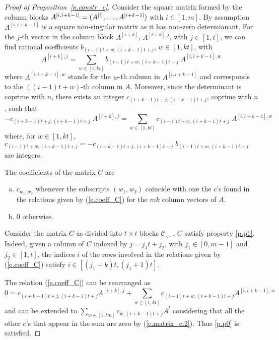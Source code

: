 \documentclass[10pt]{article}
\begin{document}
\begin{proof}[Proof of Proposition~\ref{p.constr_c}]
	Consider the square matrix formed by the column blocks $A^{[i,i+k-1]}=(A^{[i]},\linebreak[1]\ldots,\linebreak[1]A^{[i+k-1]})$ with $i\in[1,m]$. By assumption $A^{[i,i+k-1]}$ is a square non-singular matrix as it has non-zero determianant. For the $j$-th vector in the column block $A^{[i+k]}$, $A^{[i+k],j}$, with $j\in[1,t]$, we can find rational coefficients $b_{(i-1)t+w,(i+k-1)t+j}$, $w\in[1,kt]$, with
	\begin{displaymath}
		A^{[i+k],j}=\sum_{w\in[1,kt]} b_{(i-1)t+w,(i+k-1)t+j}\; A^{[i,i+k-1],w}
	\end{displaymath}
	where $A^{[i,i+k-1],w}$ stands for the $w$-th column in $A^{[i,i+k-1]}$ and corresponds to the $((i-1)t+w)$-th column in $A$. Moreover, since the determinant is coprime with $n$, there exists an integer $c_{(i+k-1)t+j,(i+k-1)t+j}$, coprime with $n$, such that
	\begin{equation}\label{e.coeff_C}
		-c_{(i+k-1)t+j,(i+k-1)t+j}\; A^{[i+k],j}=\sum_{w\in[1,kt]} c_{(i-1)t+w,(i+k-1)t+j}\; A^{[i,i+k-1],w}
	\end{equation}
	where, for $w\in[1,kt]$, $c_{(i-1)t+w,(i+k-1)t+j}=-c_{(i+k-1)t+j,(i+k-1)t+j} \; b_{(i-1)t+w,(i+k-1)t+j}$ are integers.

The coefficients of the matrix $C$ are 
\begin{enumerate}[(a)]
	\item $c_{w_1,w_2}$ whenever the subscripts $(w_1,w_2)$ coincide with one the $c$'s found in the relations given by (\ref{e.coeff_C}) for the $mk$ column vectors of $A$.
	\item \label{c.matrix_c.2} $0$ otherwise.
\end{enumerate} 
Consider the matrix $C$ as divided into $t\times t$ blocks $\mathcal{C}_{\cdot,\cdot}\;$. $C$ satisfy property \ref{p.p1}. Indeed, given a column of $C$ indexed by $j=j_1t+j_2$, with $j_1\in[0,m-1]$ and $j_2\in[1,t]$, 
the indices $i$ of the rows involved in the relations given by (\ref{e.coeff_C}) satisfy $i\in[(j_1-k)t,(j_1+1)t]$.

The relation (\ref{e.coeff_C}) can be rearranged as 
\begin{displaymath}
	0=c_{(i+k-1)t+j,(i+k-1)t+j} A^{[i+k],j}+\sum_{w\in[1,kt]} c_{(i-1)t+w,(i+k-1)t+j} A^{[i,i+k-1],w}
\end{displaymath}
and can be extended to $\sum_{w\in[1,tm]} c_{w,(i+k-1)t+j} A^l$ considering that all the other $c$'s that appear in the sum are zero by (\ref{c.matrix_c.2}).
Thus \ref{p.p0} is satisfied.


\end{proof}
\end{document}
